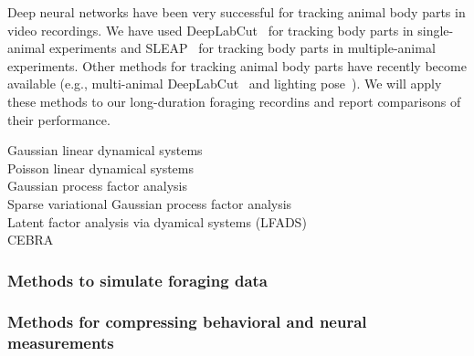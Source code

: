 Deep neural networks have been very successful for tracking animal body parts
in video recordings.
%
We have used DeepLabCut~\citep{mathisEtAl18} for tracking body parts in
single-animal experiments and SLEAP~\citep{pereriraEtAl22} for tracking body
parts in multiple-animal experiments. Other methods for tracking animal body parts have
recently become available (e.g., multi-animal DeepLabCut~\citep{lauerEtAl22}
and lighting pose~\citep{bidermanEtAl23}).
%
We will apply these methods to our long-duration foraging recordins and report
comparisons of their performance.

\begin{description}

    \item[Gaussian linear dynamical systems]

    \item[Poisson linear dynamical systems]

    \item[Gaussian process factor analysis]

    \item[Sparse variational Gaussian process factor analysis]

    \item[Latent factor analysis via dyamical systems (LFADS)]

    \item[CEBRA]

\end{description}

\subsubsection{Methods to simulate foraging data}

\subsubsection{Methods for compressing behavioral and neural measurements}

